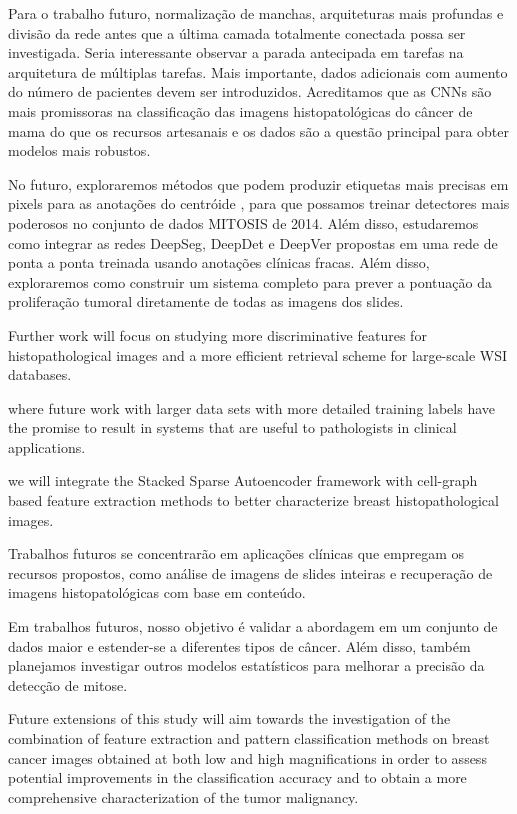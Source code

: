 \documentclass[preprint,12pt,authoryear]{elsarticle}
\begin{document}
Para o trabalho futuro, normalização de manchas, arquiteturas mais profundas e divisão da rede antes que a última camada totalmente conectada possa ser investigada. Seria interessante observar a parada antecipada em tarefas na arquitetura de múltiplas tarefas. Mais importante, dados adicionais com aumento do número de pacientes devem ser introduzidos. Acreditamos que as CNNs são mais promissoras na classificação das imagens histopatológicas do câncer de mama do que os recursos artesanais e os dados são a questão principal para obter modelos mais robustos. \citep{BAYRANOGLU2016}

No futuro, exploraremos métodos que podem produzir etiquetas mais precisas em pixels para as anotações do centróide , para que possamos treinar detectores mais poderosos no conjunto de dados MITOSIS de 2014. Além disso, estudaremos como integrar as redes DeepSeg, DeepDet e DeepVer propostas em uma rede de ponta a ponta treinada usando anotações clínicas fracas. Além disso, exploraremos como construir um sistema completo para prever a pontuação da proliferação tumoral diretamente de todas as imagens dos slides. \citep{LI2018}

Further work will focus on studying more discriminative features for histopathological images and a more efficient retrieval scheme for large-scale WSI databases. \citep{ZHENG2018}

where future work with larger data sets with more detailed training labels have the promise to result in systems that are useful to pathologists in clinical applications. \citep{GECER2018}

we will integrate the Stacked Sparse Autoencoder framework with cell-graph based feature extraction methods to better characterize breast histopathological images. \citep{XU2016}

Trabalhos futuros se concentrarão em aplicações clínicas que empregam os recursos propostos, como análise de imagens de slides inteiras e recuperação de imagens histopatológicas com base em conteúdo. \citep{ZHENG2017}

Em trabalhos futuros, nosso objetivo é validar a abordagem em um conjunto de dados maior e estender-se a diferentes tipos de câncer. Além disso, também planejamos investigar outros modelos estatísticos para melhorar a precisão da detecção de mitose. \citep{WAN2017b}

Future extensions of this study will aim towards the investigation of the combination of feature extraction and pattern classification methods on breast cancer images obtained at both low and high magnifications in order to assess potential improvements in the classification accuracy and to obtain a more comprehensive characterization of the tumor malignancy. \citep{LOUKAS2013}
\end{document}
